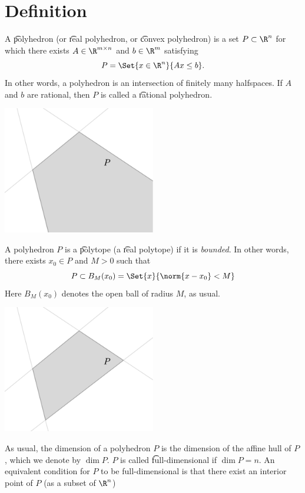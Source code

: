

\section*{Definition}

A \t{polyhedron} (or \t{real polyhedron}, or \t{convex polyhedron}) is a set $P \subset \R ^n$ for which there exists $A \in \R ^{m \times  n}$ and $b \in \R ^{m}$ satisfying
\[
P = \Set{x \in \R ^n}{Ax \leq b}.
\]
In other words, a polyhedron is an intersection of finitely many halfspaces.
If $A$ and $b$ are rational, then $P$ is called a \t{rational polyhedron}.

\begin{center}\includegraphics[width=0.50\textwidth]{./graphics/polyhedra_unbounded.pdf}\end{center}
A polyhedron $P$ is a \t{polytope} (a \t{real polytope}) if it is \textit{bounded}.
In other words, there exists $x_0 \in P$ and $M > 0$ such that
\[
P \subset B_M(x_0) = \Set{x }{\norm{x - x_0} < M}
\]
Here $B_M(x_0)$ denotes the open ball of radius $M$, as usual.

\begin{center}\includegraphics[width=0.50\textwidth]{./graphics/polytope.pdf}\end{center}
As usual, the dimension of a polyhedron $P$ is the dimension of the affine hull of $P$, which we denote by $\dim P$.
$P$ is called \t{full-dimensional} if $\dim P = n$.
An equivalent condition for $P$ to be full-dimensional is that there exist an interior point of $P$ (as a subset of $\R ^n$)

